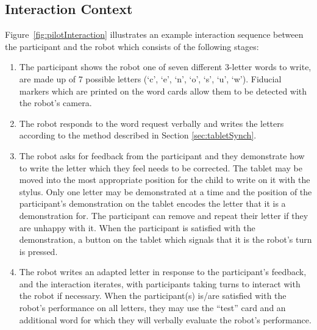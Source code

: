 \documentclass{sig-alternate}
\begin{document}
\subsection{Interaction Context}

Figure~\ref{fig:pilotInteraction}
illustrates an example interaction sequence between the participant and the
robot which consists of the following stages:

\begin{enumerate}

    \item The participant shows the robot one of seven different 3-letter words
        to write, are made up of 7 possible letters (`c', `e',
        `n', `o', `s', `u', `w'). Fiducial markers which are printed on the word
        cards allow them to be detected with the robot's camera. 

    \item The robot responds to the word request verbally and writes the
        letters according to the method described in Section \ref{sec:tabletSynch}. 

    \item The robot asks for feedback from the participant and they demonstrate
        how to write the letter which they feel needs to be corrected. The
        tablet may be moved into the most appropriate position for the child to
        write on it with the stylus. Only one letter may be demonstrated at a time and the
        position of the participant's demonstration on the tablet encodes the
        letter that it is a demonstration for. The participant can remove and
        repeat their letter if they are unhappy with it.
        When the participant is satisfied with the demonstration, a button on
        the tablet which signals that it is the robot's turn is pressed.

    \item The robot writes an adapted letter in 
        response to the participant's feedback, and the interaction iterates,
        with participants taking turns to interact with the robot if necessary.
        When the participant(s) is/are satisfied with the robot's performance on 
	all letters,
        they may use the ``test'' card and an additional word for which they will
        verbally evaluate the robot's performance. 

\end{enumerate}
\end{document}
